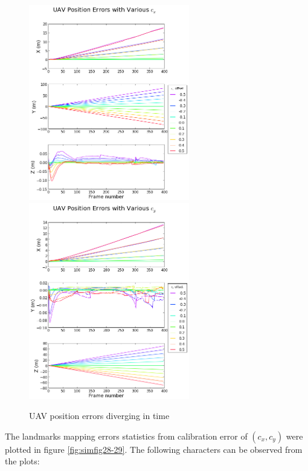 \begin{figure}[h]
  \centering
  \includegraphics[width=7cm,keepaspectratio=true]{./Figures/SimulationFigures/Figure36.png}
  \includegraphics[width=7cm,keepaspectratio=true]{./Figures/SimulationFigures/Figure37.png}
  \caption{UAV position errors diverging in time}
  \label{fig:simfig36-37}
\end{figure}
\FloatBarrier

The landmarks mapping errors statistics from calibration error of
$(c_{x}, c_{y})$ were plotted in figure \ref{fig:simfig28-29}. The
following characters can be observed from the plots:

